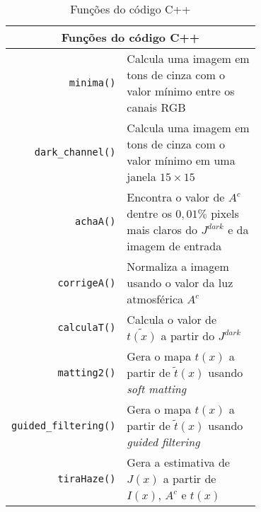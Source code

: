 \documentclass[12pt,openany, oneside,
 article, 
 a4paper, hyphens, english, brazil]{abntex2}
\begin{document}
\begin{table}
\caption{Funções do código C++}\label{tab:funcoes}
\begin{tabularx}{\textwidth}{rp{0.7\linewidth}}
\toprule
\multicolumn{2}{c}{Funções do código C++}\\
\midrule
\texttt{minima()} & Calcula uma imagem em tons de cinza com o valor mínimo entre os canais RGB\\
\texttt{dark\_channel()} & Calcula uma imagem em tons de cinza com o valor mínimo em uma janela $15\times 15$\\
\texttt{achaA()} & Encontra o valor de $A^c$ dentre os $0,01\%$ pixels mais claros do $J^{dark}$ e da imagem de entrada\\
\texttt{corrigeA()} & Normaliza a imagem usando o valor da luz atmosférica $A^c$\\
\texttt{calculaT()} & Calcula o valor de $\tilde{t(x)}$ a partir do $J^{dark}$\\
\texttt{matting2()} & Gera o mapa $t(x)$ a partir de $\tilde{t}(x)$ usando \textit{soft matting}\\
\texttt{guided\_filtering()} & Gera o mapa $t(x)$ a partir de $\tilde{t}(x)$ usando \textit{guided filtering}\\
\texttt{tiraHaze()} & Gera a estimativa de $J(x)$ a partir de $I(x)$, $A^c$ e $t(x)$\\
\bottomrule
\end{tabularx}
\end{table}
















\clearpage





	
\end{document}
